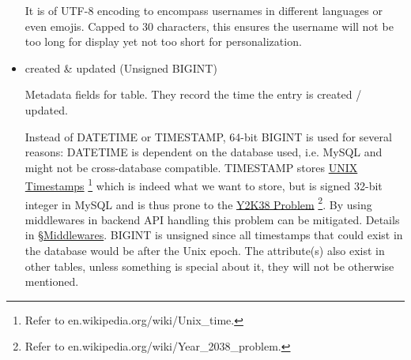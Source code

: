 \documentclass[12pt]{report}
\newcommand{\n}{\par}
\begin{document}
\begin{itemize}
	      It is of UTF-8 encoding to encompass usernames in different languages or even emojis.
	      Capped to 30 characters, this ensures the username will not be too long for display yet not too short for personalization.
	\item created \& updated (Unsigned BIGINT)\n
	      Metadata fields for table. They record the time the entry is created / updated.\n
	      Instead of DATETIME or TIMESTAMP, 64-bit BIGINT is used for several reasons:
	      DATETIME is dependent on the database used, i.e. MySQL and might not be cross-database compatible.
	      TIMESTAMP stores \href{https://en.wikipedia.org/wiki/Unix_time}{UNIX Timestamps}
	      \footnote{Refer to en.wikipedia.org/wiki/Unix\_time.}
	      which is indeed what we want to store,
	      but is signed 32-bit integer in MySQL and is thus prone to the
	      \href{https://en.wikipedia.org/wiki/Year_2038_problem}{Y2K38 Problem}
	      \footnote{Refer to en.wikipedia.org/wiki/Year\_2038\_problem.}.
	      By using middlewares in backend API handling this problem can be mitigated.
	      Details in \S \hyperref[application-layer.design.middlewares]{Middlewares}.
	      BIGINT is unsigned since all timestamps that could exist in the database would be after the Unix epoch.
	      The attribute(s) also exist in other tables, unless something is special about it, they will not be otherwise mentioned.
\end{itemize}
\end{document}
